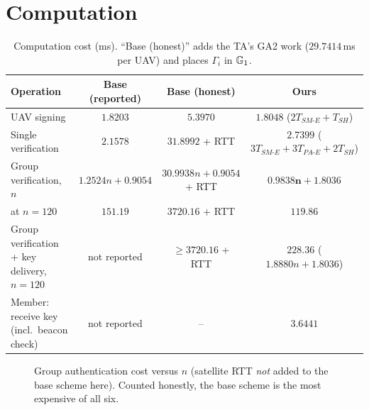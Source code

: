 \section{Computation}
\begin{table}[H]
\centering\small
\caption{Computation cost (ms). ``Base (honest)'' adds the TA's GA2 work ($29.7414$\,ms per UAV) and places $\Gamma_i$ in $\mathbb{G}_1$.}
\label{tab:comp}
\begin{tabularx}{\linewidth}{@{}>{\raggedright\arraybackslash}X ccc@{}}
\toprule
Operation & Base (reported) & Base (honest) & \textbf{Ours}\\
\midrule
UAV signing & $1.8203$ & $5.3970$ & $\mathbf{1.8048}$ \;($2T_{SM\text{-}E}+T_{SH}$)\\
Single verification & $2.1578$ & $31.8992$ + RTT & $\mathbf{2.7399}$ \;($3T_{SM\text{-}E}+3T_{PA\text{-}E}+2T_{SH}$)\\
Group verification, $n$ & $1.2524n+0.9054$ & $30.9938n+0.9054$ + RTT & $\mathbf{0.9838n+1.8036}$\\
\quad at $n=120$ & $151.19$ & $3720.16$ + RTT & $\mathbf{119.86}$\\
Group verification + key delivery, $n=120$ & not reported & $\ge 3720.16$ + RTT & $\mathbf{228.36}$ \;($1.8880n+1.8036$)\\
Member: receive key (incl.\ beacon check) & not reported & -- & $3.6441$\\
\bottomrule
\end{tabularx}
\end{table}

\begin{figure}[H]
\centering
{}
\caption{Group authentication cost versus $n$ (satellite RTT \emph{not} added to the base scheme here). Counted honestly, the base scheme is the most expensive of all six.}
\label{fig:gacost}
\end{figure}

